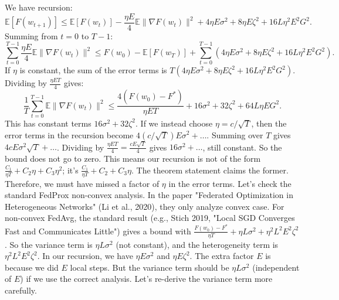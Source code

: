 \documentclass{article}
\begin{document}
We have recursion:
\begin{equation}
    \mathbb{E}[F(w_{t+1})] \leq \mathbb{E}[F(w_t)] - \frac{\eta E}{4} \mathbb{E} \| \nabla F(w_t) \|^2 + 4\eta E \sigma^2 + 8\eta E \zeta^2 + 16 L \eta^2 E^2 G^2.
\end{equation}
Summing from $t=0$ to $T-1$:
\begin{equation}
    \sum_{t=0}^{T-1} \frac{\eta E}{4} \mathbb{E} \| \nabla F(w_t) \|^2 \leq F(w_0) - \mathbb{E}[F(w_T)] + \sum_{t=0}^{T-1} \left( 4\eta E \sigma^2 + 8\eta E \zeta^2 + 16 L \eta^2 E^2 G^2 \right).
\end{equation}
If $\eta$ is constant, the sum of the error terms is $T (4\eta E \sigma^2 + 8\eta E \zeta^2 + 16 L \eta^2 E^2 G^2)$. Dividing by $\frac{\eta E T}{4}$ gives:
\begin{equation}
    \frac{1}{T} \sum_{t=0}^{T-1} \mathbb{E} \| \nabla F(w_t) \|^2 \leq \frac{4(F(w_0)-F^*)}{\eta E T} + 16 \sigma^2 + 32 \zeta^2 + 64 L \eta E G^2.
\end{equation}
This has constant terms $16\sigma^2 + 32\zeta^2$. If we instead choose $\eta = c/\sqrt{T}$, then the error terms in the recursion become $4 (c/\sqrt{T}) E \sigma^2 + \dots$. Summing over $T$ gives $4 c E \sigma^2 \sqrt{T} + \dots$. Dividing by $\frac{\eta E T}{4} = \frac{c E \sqrt{T}}{4}$ gives $16 \sigma^2 + \dots$, still constant. So the bound does not go to zero. This means our recursion is not of the form $\frac{C_1}{\eta T} + C_2 \eta + C_3 \eta^2$; it's $\frac{C_1}{\eta T} + C_2 + C_3 \eta$. The theorem statement claims the former. Therefore, we must have missed a factor of $\eta$ in the error terms. Let's check the standard FedProx non-convex analysis. In the paper "Federated Optimization in Heterogeneous Networks" (Li et al., 2020), they only analyze convex case. For non-convex FedAvg, the standard result (e.g., Stich 2019, "Local SGD Converges Fast and Communicates Little") gives a bound with $\frac{F(w_0)-F^*}{\eta T} + \eta L \sigma^2 + \eta^2 L^2 E^2 \zeta^2$. So the variance term is $\eta L \sigma^2$ (not constant), and the heterogeneity term is $\eta^2 L^2 E^2 \zeta^2$. In our recursion, we have $\eta E \sigma^2$ and $\eta E \zeta^2$. The extra factor $E$ is because we did $E$ local steps. But the variance term should be $\eta L \sigma^2$ (independent of $E$) if we use the correct analysis. Let's re-derive the variance term more carefully.
\end{document}
